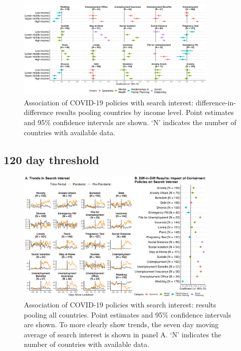 \documentclass{article}
\begin{document}
\begin{figure}[H]
    \centering
    \includegraphics[width=0.85\textwidth]{figures/did_income_60.png}
    \caption{Association of COVID-19 policies with search interest: difference-in-difference results pooling countries by income level. Point estimates and 95\% confidence intervals are shown. `N' indicates the number of countries with available data.}
    \label{fig:did_income_60}
\end{figure}

\newpage
\subsection{120 day threshold}

\begin{figure}[H]
    \centering
    \includegraphics[width=0.85\textwidth]{figures/did_overall_120.png}
    \caption{Association of COVID-19 policies with search interest: results pooling all countries. Point estimates and 95\% confidence intervals are shown. To more clearly show trends, the seven day moving average of search interest is shown in panel A. `N' indicates the number of countries with available data.}
    \label{fig:lockdown_impact_120}
\end{figure}
\end{document}
